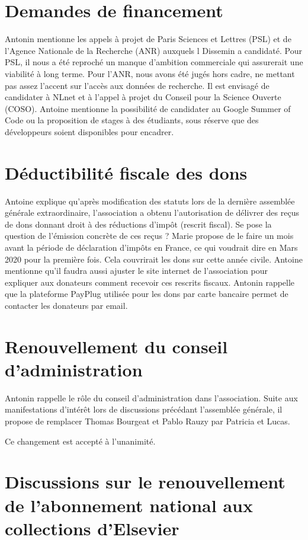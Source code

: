 \documentclass[a4paper]{article}
\begin{document}
\section{Demandes de financement}

Antonin mentionne les appels à projet de Paris Sciences et Lettres (PSL) et de l'Agence Nationale de la Recherche (ANR) auxquels l Dissemin a candidaté.
Pour PSL, il nous a été reproché un manque d'ambition commerciale qui assurerait une viabilité à long terme. Pour l'ANR, nous avons été jugés hors cadre, ne mettant pas assez l'accent sur l'accès aux données de recherche.
Il est envisagé de candidater à NLnet et à l'appel à projet du Conseil pour la Science Ouverte (COSO).
Antoine mentionne la possibilité de candidater au Google Summer of Code ou la proposition de stages à des étudiants, sous réserve que des développeurs soient disponibles pour encadrer.

\section{Déductibilité fiscale des dons}
Antoine explique qu'après modification des statuts lors de la dernière assemblée générale extraordinaire, l'association a obtenu l'autorisation de délivrer des reçus de dons donnant droit à des réductions d'impôt (rescrit fiscal).
Se pose la question de l'émission concrète de ces reçus ?
Marie propose de le faire un mois avant la période de déclaration d'impôts en France, ce qui voudrait dire en Mars 2020 pour la première fois. Cela couvrirait les dons sur cette année civile. Antoine mentionne qu'il faudra aussi ajuster le site internet de
l'association pour expliquer aux donateurs comment recevoir ces rescrits fiscaux.
Antonin rappelle que la plateforme PayPlug utilisée pour les dons par carte bancaire
permet de contacter les donateurs par email.

\section{Renouvellement du conseil d'administration}

Antonin rappelle le rôle du conseil d'administration dans l'association.
Suite aux manifestations d'intérêt lors de discussions précédant l'assemblée générale,
il propose de remplacer Thomas Bourgeat et Pablo Rauzy par Patricia et Lucas.

Ce changement est accepté à l'unanimité.
  
\section{Discussions sur le renouvellement de l'abonnement national aux collections d'Elsevier}
\end{document}
